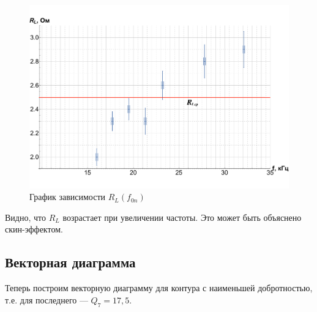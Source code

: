 \documentclass[a4paper, 12pt]{article}
\begin{document}
            \begin{figure}[h!]
                \includegraphics[scale=0.5]{img/RR.pdf}
                \caption{График зависимости $ R_L (f_{0n}) $}
            \end{figure}

            Видно, что $ R_L$ возрастает при увеличении частоты. Это может быть объяснено скин-эффектом.

            \newpage

        \subsection{Векторная диаграмма}

            Теперь построим векторную диаграмму для контура с наименьшей добротностью, т.е. для последнего --- $ Q_7 = 17,5 $.
\end{document}
